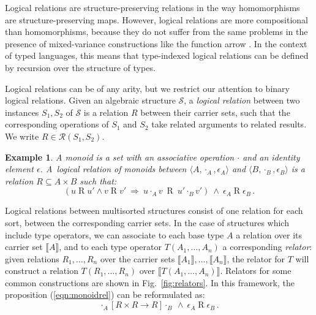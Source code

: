 \documentclass[draft,11pt]{report}
\newtheorem{example}{Example}
\newcommand{\ifr}[1]{\mathrel{[{#1}]}}
\begin{document}
Logical relations are structure-preserving relations
in the way homomorphisms are structure-preserving maps.
However,
logical relations are more compositional than homomorphisms,
because they do not suffer from the same problems
in the presence of mixed-variance constructions
like the function arrow %
\cite{lrp}.
In the context of typed languages,
this means that type-indexed logical relations
can be defined by recursion over the structure of types.


Logical relations can be of any arity,
but
we restrict our attention to
binary logical relations.
Given an algebraic structure $\mathcal{S}$,
a \emph{logical relation}
between two instances $S_1, S_2$ of $\mathcal{S}$
is a relation $R$
between their carrier sets,
such that the corresponding operations of $S_1$ and $S_2$
take related arguments to related results.
We write $R \in \mathcal{R}(S_1, S_2)$.

\begin{example}%
\label{ex:monoid}
A monoid is a set with
an associative operation $\cdot$ and
an identity element $\epsilon$.
A~\emph{logical relation of monoids} between
$\langle A, \cdot_A, \epsilon_A \rangle$ and
$\langle B, \cdot_B, \epsilon_B \rangle$
is a relation $R \subseteq A \times B$
such that:
\begin{equation}
\label{eqn:monoidrel}
(u \mathrel{R} u' \wedge v \mathrel{R} v' \: \Rightarrow \:
 u \cdot_A v \: \mathrel{R} \: u' \cdot_B v')
\: \wedge \:
\epsilon_A \mathrel{R} \epsilon_B \,.
\end{equation}
\end{example}

Logical relations between multisorted structures
consist of one relation for each sort,
between the corresponding carrier sets.
In the case of structures which include type operators,
we can associate to each base type $A$
a relation over its carrier set $\llbracket A \rrbracket$,
and to each type operator $T(A_1, \ldots, A_n)$
a corresponding \emph{relator}:
given relations $R_1, \ldots, R_n$ over
the carrier sets $\llbracket A_1 \rrbracket, \ldots, \llbracket A_n \rrbracket$,
the relator for $T$
will construct a relation $T(R_1, \ldots, R_n)$
over $\llbracket T(A_1, \ldots, A_n) \rrbracket$.
Relators for some common constructions are shown in Fig.~\ref{fig:relators}.
In this framework, the proposition (\ref{eqn:monoidrel}) can be reformulated as:
\[
  \cdot_A \ifr{R \times R \rightarrow R} \cdot_B
  \: \wedge \:
  \epsilon_A \mathrel{R} \epsilon_B \,.
\]
\end{document}

